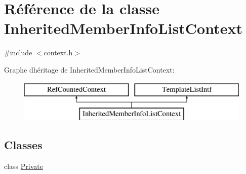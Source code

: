 \hypertarget{class_inherited_member_info_list_context}{}\section{Référence de la classe Inherited\+Member\+Info\+List\+Context}
\label{class_inherited_member_info_list_context}


{\ttfamily \#include $<$context.\+h$>$}

Graphe d\textquotesingle{}héritage de Inherited\+Member\+Info\+List\+Context\+:\begin{figure}[H]
\begin{center}
\leavevmode
\includegraphics[height=2.000000cm]{class_inherited_member_info_list_context}
\end{center}
\end{figure}
\subsection*{Classes}
\begin{DoxyCompactItemize}
\item 
class \hyperlink{class_inherited_member_info_list_context_1_1_private}{Private}
\end{DoxyCompactItemize}
